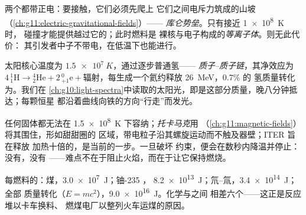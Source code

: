 \begin{definition}[库仑势垒]\label{def:g12:nuclear-energy:barrier}
两个都带正电：要接触，它们必须先爬上
它们之间电斥力筑成的山坡（\cref{ch:g11:electric-gravitational-fields}）——
\emph{库仑势垒}。只有接近 \qty{1e8}{K} 时，
碰撞才能提供越过它的；此时燃料是
裸核与电子构成的\emph{等离子体}。则无此代价：
其引发者中子不带电，在低温下也能进行。
\end{definition}

\begin{example}[太阳靠它发光]\label{ex:g12:nuclear-energy:sun}
太阳核心温度为 $\qty{1.5e7}{K}$，通过逐步普通氢——
\emph{质子–质子链}，其净效应为
$4\,{}^{1}_{1}\mathrm{H} \to {}^{4}_{2}\mathrm{He} + 2\,{}^{0}_{+1}\mathrm{e}
+ \text{辐射}$，每生成一个氦约释放 \qty{26}{MeV}，$0.7\%$ 的
氢质量转化为。我们在
\cref{ch:g10:light-spectra}中读取的太阳光，即是这部分质量，晚八分钟抵达；每颗恒星
都沿着曲线向铁的方向“行走”而发光。
\end{example}

\begin{remark}\label{rem:g12:nuclear-energy:iter}
任何固体都无法在 \qty{1.5e8}{K} 下容纳；\emph{托卡马克}用
（\cref{ch:g11:magnetic-fields}）将其围住，形如甜甜圈的
区域，带电粒子沿其螺旋运动而不触及器壁；ITER 旨在释放
加热十倍的，是当前的一步。一旦破坏
约束，便会在数秒内降温并停止：没有，没有
——难点不在于阻止火焰，而在于让它保持燃烧。
\end{remark}

\begin{example}[每千克的能量阶梯]\label{ex:g12:nuclear-energy:ladder}
每燃料的：煤，\qty{3.0e7}{J}；铀-235 ，
\qty{8.2e13}{J}；氘–氚，\qty{3.4e14}{J}；全部
质量转化（$E = mc^2$），\qty{9.0e16}{J}。化学与之间
相差六个——这正是反应堆以卡车换料、
燃煤电厂以整列火车运煤的原因。
\end{example}

